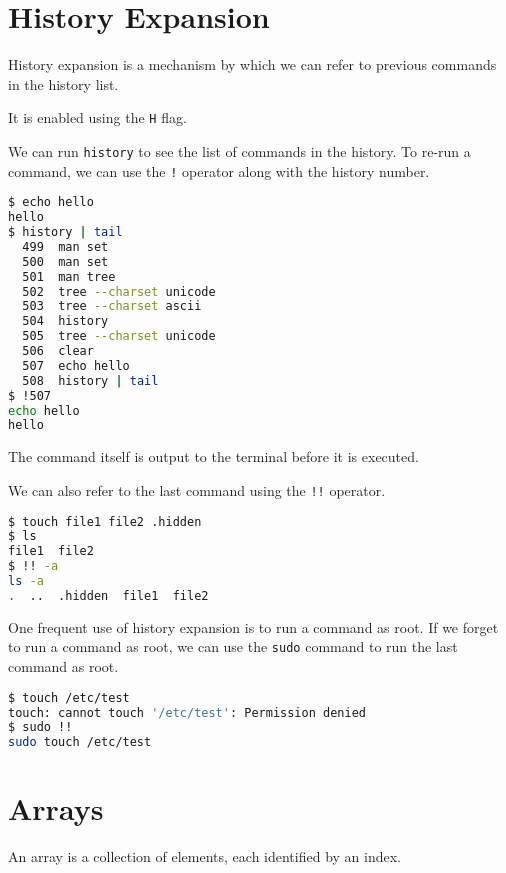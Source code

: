 \section{History Expansion}

\begin{definition}
  History expansion is a mechanism by which we can refer to previous commands in the history list.
\end{definition}

It is enabled using the \lstinline{H} flag.

We can run \lstinline{history} to see the list of commands in the history.
To re-run a command, we can use the \lstinline{!} operator along with the history number.

\begin{lstlisting}[language=bash]
$ echo hello
hello
$ history | tail
  499  man set
  500  man set
  501  man tree
  502  tree --charset unicode
  503  tree --charset ascii
  504  history
  505  tree --charset unicode
  506  clear
  507  echo hello
  508  history | tail
$ !507
echo hello
hello
\end{lstlisting}

The command itself is output to the terminal before it is executed.

We can also refer to the last command using the \lstinline{!!} operator.

\begin{lstlisting}[language=bash]
$ touch file1 file2 .hidden
$ ls
file1  file2
$ !! -a
ls -a
.  ..  .hidden  file1  file2
\end{lstlisting}

One frequent use of history expansion is to run a command as root.
If we forget to run a command as root, we can use the \lstinline{sudo} command to run the last command as root.

\begin{lstlisting}[language=bash]
$ touch /etc/test
touch: cannot touch '/etc/test': Permission denied
$ sudo !!
sudo touch /etc/test
\end{lstlisting}

\section{Arrays}

\begin{definition}[Array]
  An array is a collection of elements, each identified by an index.
\end{definition}

